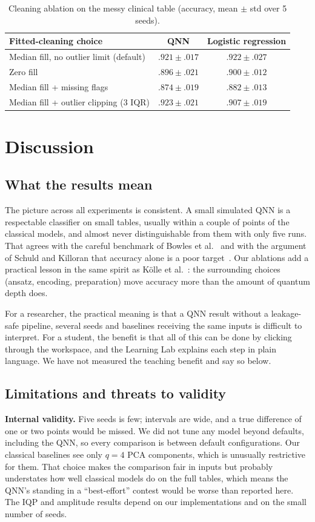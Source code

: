 \documentclass[12pt,onecolumn,draftclsnofoot]{IEEEtran}
\begin{document}
\begin{table}[!t]
\caption{Cleaning ablation on the messy clinical table (accuracy, mean $\pm$ std over 5 seeds).}
\label{tab:clean}
\centering\small
\begin{tabular}{lcc}
\toprule
Fitted-cleaning choice & QNN & Logistic regression\\
\midrule
Median fill, no outlier limit (default) & $.921\pm.017$ & $.922\pm.027$\\
Zero fill & $.896\pm.021$ & $.900\pm.012$\\
Median fill + missing flags & $.874\pm.019$ & $.882\pm.013$\\
Median fill + outlier clipping (3 IQR) & $\mathbf{.923}\pm.021$ & $.907\pm.019$\\
\bottomrule
\end{tabular}
\end{table}

\section{Discussion}
\subsection{What the results mean}
The picture across all experiments is consistent. A small simulated QNN is a respectable classifier on small tables, usually within a couple of points of the classical models, and almost never distinguishable from them with only five runs. That agrees with the careful benchmark of Bowles et al.~\cite{bowles2024better} and with the argument of Schuld and Killoran that accuracy alone is a poor target~\cite{schuld2022advantage}. Our ablations add a practical lesson in the same spirit as K\"olle et al.~\cite{kolle2023disentangling}: the surrounding choices (ansatz, encoding, preparation) move accuracy more than the amount of quantum depth does.

For a researcher, the practical meaning is that a QNN result without a leakage-safe pipeline, several seeds and baselines receiving the same inputs is difficult to interpret. For a student, the benefit is that all of this can be done by clicking through the workspace, and the Learning Lab explains each step in plain language. We have not measured the teaching benefit and say so below.

\subsection{Limitations and threats to validity}
\textbf{Internal validity.} Five seeds is few; intervals are wide, and a true difference of one or two points would be missed. We did not tune any model beyond defaults, including the QNN, so every comparison is between default configurations. Our classical baselines see only $q=4$ PCA components, which is unusually restrictive for them. That choice makes the comparison fair in inputs but probably understates how well classical models do on the full tables, which means the QNN's standing in a ``best-effort'' contest would be worse than reported here. The IQP and amplitude results depend on our implementations and on the small number of seeds.
\end{document}
